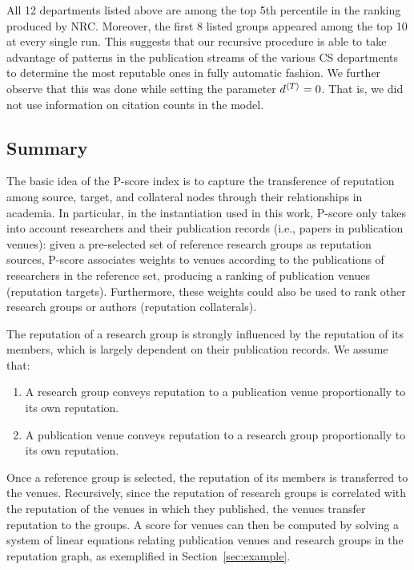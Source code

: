 \documentclass[notitlepage]{svjour3}
\begin{document}
All 12 departments listed above are among the top 5th percentile in the ranking produced by NRC. 
Moreover, the first 8 listed groups appeared among the top 10 at every single run.
This suggests that our recursive procedure is able to take advantage of patterns in the publication 
streams of the various CS departments to determine the most reputable ones in fully automatic fashion.
We further observe that this was done while setting the parameter $d{^{\langle T \rangle}} = 0$. That is, we did 
not use information on citation counts in the model. 

\subsection{Summary} 

The basic idea of the P-score index is to capture the transference of reputation among source, 
target, and collateral nodes through their relationships in academia. In particular, in the 
instantiation used in this work, P-score only takes into account researchers and 
their publication records (i.e., papers in publication venues): given a pre-selected 
set of reference research groups as reputation sources, P-score associates weights to
venues according to the publications of researchers in the reference set, producing a ranking of 
publication venues (reputation targets). Furthermore, these weights could also be used to rank other 
research groups or authors (reputation collaterals).

The reputation of a research group is strongly influenced by the reputation of its members, 
which is largely dependent on their publication records. We assume that:
\begin{enumerate}
\item A research group conveys reputation to a publication venue proportionally to its own reputation.
\item A publication venue conveys reputation to a research group proportionally to its own reputation.
\end{enumerate}

Once a reference group is selected, the reputation of its members is transferred to the venues. 
Recursively, since the reputation of research groups is correlated with the reputation of the 
venues in which they published, the venues transfer reputation to the groups. A score for venues 
can then be computed by solving a system of linear equations relating publication venues and 
research groups in the reputation graph, as exemplified in Section~\ref{sec:example}.
\end{document}
